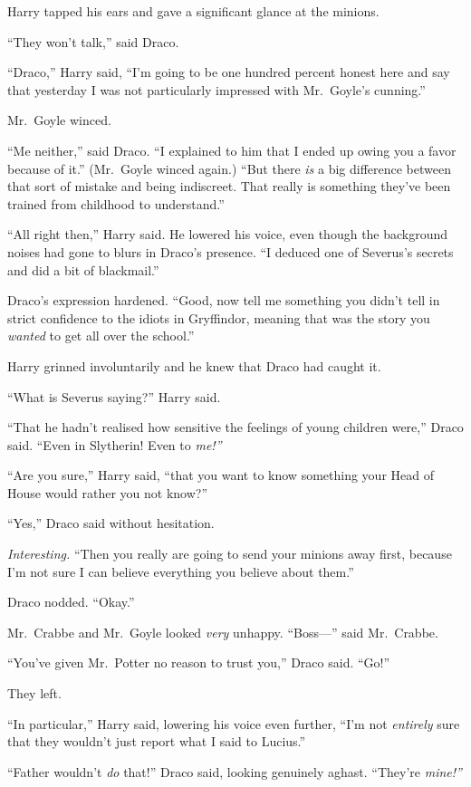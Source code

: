 Harry tapped his ears and gave a significant glance at the minions.

``They won't talk,'' said Draco.

``Draco,'' Harry said, ``I'm going to be one hundred percent honest here
and say that yesterday I was not particularly impressed with Mr.~Goyle's
cunning.''

Mr.~Goyle winced.

``Me neither,'' said Draco. ``I explained to him that I ended up owing
you a favor because of it.'' (Mr.~Goyle winced again.) ``But there
\emph{is} a big difference between that sort of mistake and being
indiscreet. That really is something they've been trained from childhood
to understand.''

``All right then,'' Harry said. He lowered his voice, even though the
background noises had gone to blurs in Draco's presence. ``I deduced one
of Severus's secrets and did a bit of blackmail.''

Draco's expression hardened. ``Good, now tell me something you didn't
tell in strict confidence to the idiots in Gryffindor, meaning that was
the story you \emph{wanted} to get all over the school.''

Harry grinned involuntarily and he knew that Draco had caught it.

``What is Severus saying?'' Harry said.

``That he hadn't realised how sensitive the feelings of young children
were,'' Draco said. ``Even in Slytherin! Even to \emph{me!''}

``Are you sure,'' Harry said, ``that you want to know something your
Head of House would rather you not know?''

``Yes,'' Draco said without hesitation.

\emph{Interesting.} ``Then you really are going to send your minions
away first, because I'm not sure I can believe everything you believe
about them.''

Draco nodded. ``Okay.''

Mr.~Crabbe and Mr.~Goyle looked \emph{very} unhappy. ``Boss---'' said
Mr.~Crabbe.

``You've given Mr.~Potter no reason to trust you,'' Draco said. ``Go!''

They left.

``In particular,'' Harry said, lowering his voice even further, ``I'm
not \emph{entirely} sure that they wouldn't just report what I said to
Lucius.''

``Father wouldn't \emph{do} that!'' Draco said, looking genuinely
aghast. ``They're \emph{mine!''}

